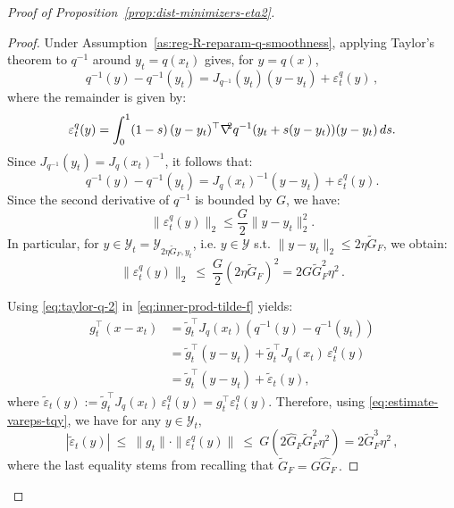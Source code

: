 \documentclass[a4paper,11pt,fullpage]{article}
\def\Y{{\mathcal Y}}
\theoremstyle{plain}
\theoremstyle{definition}
\theoremstyle{plain}
\renewcommand{\leq}{~\le~}
\let\nablaold\nabla
\renewcommand{\nabla}{\nablaold\mkern-2.5mu}
\begin{document}
\begin{proof}[Proof of Proposition~\ref{prop:dist-minimizers-eta2}]
\begin{proof}
Under Assumption~\ref{as:reg-R-reparam-q-smoothness}, applying Taylor's theorem to $q^{-1}$ around $y_t=q(x_t)$ gives, for $y=q(x)$,
\begin{equation}
\label{eq:taylor-q-1}
q^{-1}(y)-q^{-1}(y_t)
=
J_{q^{-1}}(y_t)(y-y_t)
+
\varepsilon_t^q(y)\,,
\end{equation}
where the remainder is given by: 
\begin{equation}
\label{eq:remainder-eps-t-q}
\varepsilon_t^q(y) 
= \int_0^1 (1-s)\, (y-y_t)^{\top}
\nabla^2 q^{-1}(y_t+s(y-y_t))
(y-y_t)\,ds.
\end{equation}
Since \(J_{q^{-1}}(y_t)=J_q(x_t)^{-1}\), it follows that: 
\begin{equation}
\label{eq:taylor-q-2}
q^{-1}(y)-q^{-1}(y_t) = J_q(x_t)^{-1}(y-y_t) + \varepsilon_t^q(y).
\end{equation}
Since the second derivative of \(q^{-1}\) is bounded by \(G\), we have:
\begin{equation*}
\|\varepsilon_t^q(y)\|_2
\le
\frac{G}{2}\|y-y_t\|_2^2.
\end{equation*}
In particular, for $y\in \Y_t = \mathcal Y_{2\eta \tilde{G}_F,y_t}$, i.e. $y \in \Y$ s.t.
$\|y-y_t\|_2\le 2\eta \tilde{G}_F$, we obtain: 
\begin{equation}
\label{eq:estimate-vareps-tqy}
\|\varepsilon_t^q(y)\|_2 \leq \frac{G}{2} (2\eta \tilde{G}_F)^2 = 2 G \tilde{G}_F^2 \eta^2\,.
\end{equation}

Using \eqref{eq:taylor-q-2} in \eqref{eq:inner-prod-tilde-f} yields:  
\begin{align}
\label{eq:term-inner-prod-rewriting}
g_t^\top (x-x_t)
&= \tilde{g}_t^\top J_q(x_t)(q^{-1}(y) - q^{-1}(y_t)) \nonumber\\
&= \tilde{g}_t^\top(y-y_t) + \tilde{g}_t^\top J_q(x_t)\,\varepsilon_t^q(y) \nonumber\\
&= \tilde{g}_t^\top(y-y_t) + \tilde\varepsilon_t(y),
\end{align}
where 
$\tilde\varepsilon_t(y) :=
\tilde{g}_t^\top J_q(x_t)\,\varepsilon_t^q(y)
= g_t^{\top} \varepsilon_t^q(y)$. Therefore, using \eqref{eq:estimate-vareps-tqy}, we have for any $y \in \Y_t,$ 
\begin{equation*}
|\tilde\varepsilon_t(y)| \leq \|g_t\| \cdot \|\varepsilon_t^q(y)\| \leq G (2\hat{G}_F \tilde{G}_F^2 \eta^2) = 2 \tilde{G}_F^3 \eta^2\,,
\end{equation*}
where the last equality stems from recalling that $\tilde{G}_F = G \hat{G}_F\,.$ 


\end{proof}
\end{proof}
\end{document}
